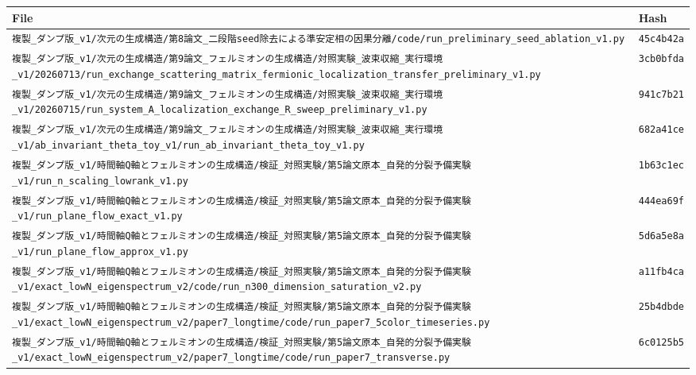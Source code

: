 \documentclass[
  10pt,
]{article}
\newcounter{none} %
\begin{document}
{\def\LTcaptype{none} %
\begin{longtable}[]{@{}
  >{\raggedright\arraybackslash}p{}
  >{\raggedright\arraybackslash}p{}@{}}
\toprule\noalign{}
\begin{minipage}[b]{\linewidth}\raggedright
File
\end{minipage} & \begin{minipage}[b]{\linewidth}\raggedright
Hash
\end{minipage} \\
\midrule\noalign{}
\endhead
\bottomrule\noalign{}
\endlastfoot
\texttt{複製\_ダンプ版\_v1/次元の生成構造/第8論文\_二段階seed除去による準安定相の因果分離/code/run\_preliminary\_seed\_ablation\_v1.py}
& \texttt{45c4b42a} \\
\texttt{複製\_ダンプ版\_v1/次元の生成構造/第9論文\_フェルミオンの生成構造/対照実験\_波束収縮\_実行環境\_v1/20260713/run\_exchange\_scattering\_matrix\_fermionic\_localization\_transfer\_preliminary\_v1.py}
& \texttt{3cb0bfda} \\
\texttt{複製\_ダンプ版\_v1/次元の生成構造/第9論文\_フェルミオンの生成構造/対照実験\_波束収縮\_実行環境\_v1/20260715/run\_system\_A\_localization\_exchange\_R\_sweep\_preliminary\_v1.py}
& \texttt{941c7b21} \\
\texttt{複製\_ダンプ版\_v1/次元の生成構造/第9論文\_フェルミオンの生成構造/対照実験\_波束収縮\_実行環境\_v1/ab\_invariant\_theta\_toy\_v1/run\_ab\_invariant\_theta\_toy\_v1.py}
& \texttt{682a41ce} \\
\texttt{複製\_ダンプ版\_v1/時間軸Q軸とフェルミオンの生成構造/検証\_対照実験/第5論文原本\_自発的分裂予備実験\_v1/run\_n\_scaling\_lowrank\_v1.py}
& \texttt{1b63c1ec} \\
\texttt{複製\_ダンプ版\_v1/時間軸Q軸とフェルミオンの生成構造/検証\_対照実験/第5論文原本\_自発的分裂予備実験\_v1/run\_plane\_flow\_exact\_v1.py}
& \texttt{444ea69f} \\
\texttt{複製\_ダンプ版\_v1/時間軸Q軸とフェルミオンの生成構造/検証\_対照実験/第5論文原本\_自発的分裂予備実験\_v1/run\_plane\_flow\_approx\_v1.py}
& \texttt{5d6a5e8a} \\
\texttt{複製\_ダンプ版\_v1/時間軸Q軸とフェルミオンの生成構造/検証\_対照実験/第5論文原本\_自発的分裂予備実験\_v1/exact\_lowN\_eigenspectrum\_v2/code/run\_n300\_dimension\_saturation\_v2.py}
& \texttt{a11fb4ca} \\
\texttt{複製\_ダンプ版\_v1/時間軸Q軸とフェルミオンの生成構造/検証\_対照実験/第5論文原本\_自発的分裂予備実験\_v1/exact\_lowN\_eigenspectrum\_v2/paper7\_longtime/code/run\_paper7\_5color\_timeseries.py}
& \texttt{25b4dbde} \\
\texttt{複製\_ダンプ版\_v1/時間軸Q軸とフェルミオンの生成構造/検証\_対照実験/第5論文原本\_自発的分裂予備実験\_v1/exact\_lowN\_eigenspectrum\_v2/paper7\_longtime/code/run\_paper7\_transverse.py}
& \texttt{6c0125b5} \\
\end{longtable}
}
\end{document}
